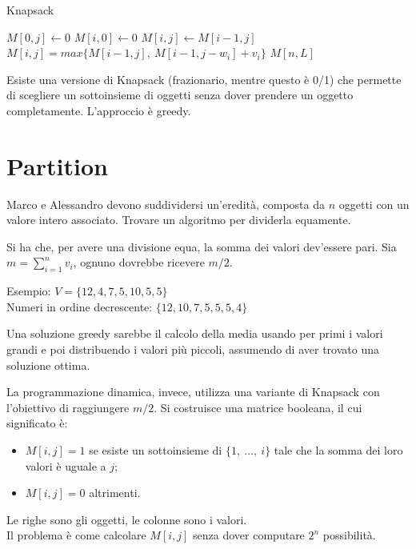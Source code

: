 \begin{algorithm}[H]
	\caption{Knapsack}
	\begin{algorithmic}
			\State $M[0, j] \gets 0$
		\EndFor
			\State $M[i, 0] \gets 0$
		\EndFor
					\State $M[i, j] \gets M[i-1, j]$
				\Else
					\State $M[i, j] = max\{M[i-1, j],\ M[i-1, j-w_i] + v_i\}$
				\EndIf
			\EndFor
		\EndFor
		\State \Return$M[n, L]$
	\EndFunction
	\end{algorithmic}
\end{algorithm}

Esiste una versione di Knapsack (frazionario, mentre questo è 0/1) che permette di scegliere un sottoinsieme di oggetti senza dover prendere un oggetto completamente. L'approccio è greedy. 

\section{Partition}
Marco e Alessandro devono suddividersi un'eredità, composta da $n$ oggetti con un valore intero associato. Trovare un algoritmo per dividerla equamente.

Si ha che, per avere una divisione equa, la somma dei valori dev'essere pari. Sia $m = \sum_{i=1}^{n} v_i$, ognuno dovrebbe ricevere $m / 2$.

Esempio: $V = \{12, 4, 7, 5, 10, 5, 5\}$ \\
Numeri in ordine decrescente: $\{12, 10, 7, 5, 5, 5,4\}$ 

Una soluzione greedy sarebbe il calcolo della media usando per primi i valori grandi e poi distribuendo i valori più piccoli, assumendo di aver trovato una soluzione ottima.
 
La programmazione dinamica, invece, utilizza una variante di Knapsack con l'obiettivo di raggiungere $m / 2$. Si costruisce una matrice booleana, il cui significato è:
\begin{itemize}
	\item $M[i, j] = 1$ se esiste un sottoinsieme di $\{1,\ \dots,\ i\}$ tale che la somma dei loro valori è uguale a $j$;
	\item $M[i, j] = 0$ altrimenti.
\end{itemize}

Le righe sono gli oggetti, le colonne sono i valori. \\
Il problema è come calcolare $M[i, j]$ senza dover computare $2^n$ possibilità. 

